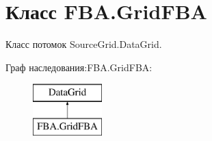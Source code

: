 \hypertarget{class_f_b_a_1_1_grid_f_b_a}{}\section{Класс F\+B\+A.\+Grid\+F\+BA}
\label{class_f_b_a_1_1_grid_f_b_a}


Класс потомок Source\+Grid.\+Data\+Grid.  


Граф наследования\+:F\+B\+A.\+Grid\+F\+BA\+:\begin{figure}[H]
\begin{center}
\leavevmode
\includegraphics[height=2.000000cm]{class_f_b_a_1_1_grid_f_b_a}
\end{center}
\end{figure}
